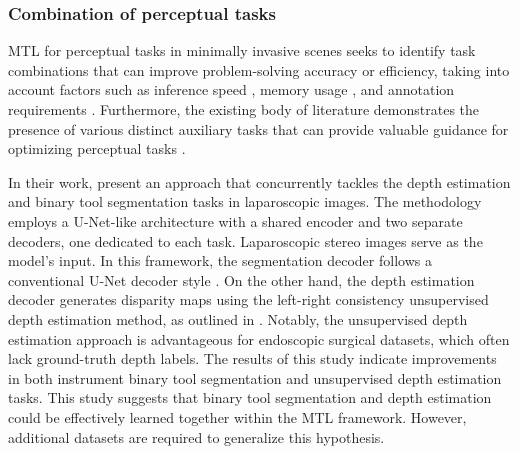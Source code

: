 \documentclass[times,twocolumn,final]{elsarticle}
\begin{document}
\subsubsection{Combination of perceptual tasks}
MTL for perceptual tasks in minimally invasive scenes seeks to identify task combinations that can improve problem-solving accuracy \citep{simultaneous_depth_tool_seg,islam2020apmtl,scalable_joint_detection,multi_contour,multi_HOG,landmark_detection_submucosal} or efficiency, taking into account factors such as inference speed \citep{scalable_joint_detection,islam2020apmtl}, memory usage \citep{scalable_joint_detection,islam2020apmtl}, and annotation requirements \citep{scalable_joint_detection}. Furthermore, the existing body of literature demonstrates the presence of various distinct auxiliary tasks that can provide valuable guidance for optimizing perceptual tasks \citep{multi_contour,multi_HOG,landmark_detection_submucosal}.



In their work, \citet{simultaneous_depth_tool_seg} present an approach that concurrently tackles the depth estimation and binary tool segmentation tasks in laparoscopic images. The methodology employs a U-Net-like architecture with a shared encoder and two separate decoders, one dedicated to each task. Laparoscopic stereo images serve as the model's input.
In this framework, the segmentation decoder follows a conventional U-Net decoder style \citep{unet}. On the other hand, the depth estimation decoder generates disparity maps using the left-right consistency unsupervised depth estimation method, as outlined in \citet{monodepth17}. Notably, the unsupervised depth estimation approach is advantageous for endoscopic surgical datasets, which often lack ground-truth depth labels.
The results of this study indicate improvements in both instrument binary tool segmentation and unsupervised depth estimation tasks. This study suggests that binary tool segmentation and depth estimation could be effectively learned together within the MTL framework. However, additional datasets are required to generalize this hypothesis.
\end{document}
